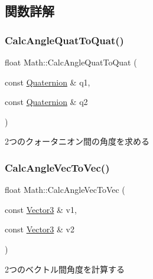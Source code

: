 \subsection{関数詳解}
\mbox{\label{namespace_math_a573c0790a83c7b0056ade0534c3c26e5}} 
\subsubsection{\texorpdfstring{Calc\+Angle\+Quat\+To\+Quat()}{CalcAngleQuatToQuat()}}
{\footnotesize\ttfamily float Math\+::\+Calc\+Angle\+Quat\+To\+Quat (\begin{DoxyParamCaption}\item[{const \mbox{\hyperlink{struct_math_1_1_quaternion}{Quaternion}} \&}]{q1,  }\item[{const \mbox{\hyperlink{struct_math_1_1_quaternion}{Quaternion}} \&}]{q2 }\end{DoxyParamCaption})}



2つのクォータニオン間の角度を求める 

\mbox{\label{namespace_math_ac1dbf09b73e7c8d4144887c802c66fdc}} 
\subsubsection{\texorpdfstring{Calc\+Angle\+Vec\+To\+Vec()}{CalcAngleVecToVec()}}
{\footnotesize\ttfamily float Math\+::\+Calc\+Angle\+Vec\+To\+Vec (\begin{DoxyParamCaption}\item[{const \mbox{\hyperlink{struct_math_1_1_vector3}{Vector3}} \&}]{v1,  }\item[{const \mbox{\hyperlink{struct_math_1_1_vector3}{Vector3}} \&}]{v2 }\end{DoxyParamCaption})}



2つのベクトル間角度を計算する 

\mbox{\label{namespace_math_a63a182d010a122c2bf2332d080682068}} 

